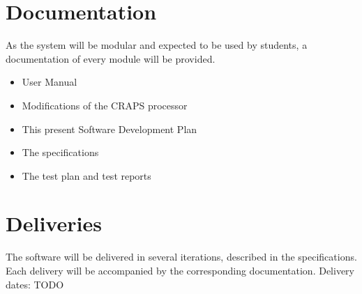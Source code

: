 \documentclass{article}
\begin{document}
  \section{Documentation}
    As the system will be modular and expected to be used by students, a
    documentation of every module will be provided.

    \begin{itemize}
      \item User Manual
      \item Modifications of the CRAPS processor
      \item This present Software Development Plan
      \item The specifications
      \item The test plan and test reports
    \end{itemize}

    \section{Deliveries}
      The software will be delivered in several iterations, described in the
      specifications. Each delivery will be accompanied by the corresponding
      documentation.
      Delivery dates:
        TODO
\end{document}
